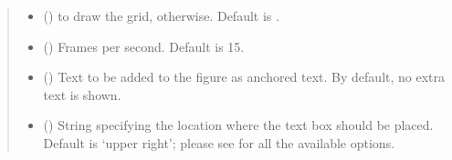 \documentclass[letterpaper,10pt,english]{sphinxmanual}
\begin{document}
\begin{fulllineitems}
\begin{quote}
\begin{description}
\begin{itemize}
\item {} 
 () \textendash{}  to draw the grid,  otherwise. Default is .

\item {} 
 () \textendash{} Frames per second. Default is 15.

\item {} 
 () \textendash{} Text to be added to the figure as anchored text. By default, no extra text is shown.

\item {} 
 () \textendash{} String specifying the location where the text box should be placed. Default is ‘upper right’;
please see  for all the available options.

\end{itemize}

\end{description}\end{quote}

\end{fulllineitems}

\end{document}
